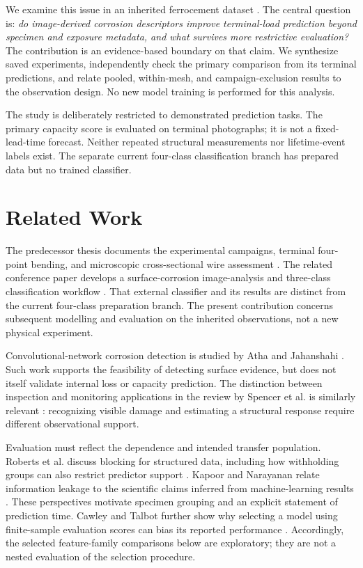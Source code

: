 \documentclass[conference]{IEEEtran}
\begin{document}
We examine this issue in an inherited ferrocement dataset \cite{hossain_thesis,artiste2025}. The central question is: \emph{do image-derived corrosion descriptors improve terminal-load prediction beyond specimen and exposure metadata, and what survives more restrictive evaluation?} The contribution is an evidence-based boundary on that claim. We synthesize saved experiments, independently check the primary comparison from its terminal predictions, and relate pooled, within-mesh, and campaign-exclusion results to the observation design. No new model training is performed for this analysis.

The study is deliberately restricted to demonstrated prediction tasks. The primary capacity score is evaluated on terminal photographs; it is not a fixed-lead-time forecast. Neither repeated structural measurements nor lifetime-event labels exist. The separate current four-class classification branch has prepared data but no trained classifier.

\section{Related Work}
The predecessor thesis documents the experimental campaigns, terminal four-point bending, and microscopic cross-sectional wire assessment \cite{hossain_thesis}. The related conference paper develops a surface-corrosion image-analysis and three-class classification workflow \cite{artiste2025}. That external classifier and its results are distinct from the current four-class preparation branch. The present contribution concerns subsequent modelling and evaluation on the inherited observations, not a new physical experiment.

Convolutional-network corrosion detection is studied by Atha and Jahanshahi \cite{atha2018}. Such work supports the feasibility of detecting surface evidence, but does not itself validate internal loss or capacity prediction. The distinction between inspection and monitoring applications in the review by Spencer et al. is similarly relevant \cite{spencer2019}: recognizing visible damage and estimating a structural response require different observational support.

Evaluation must reflect the dependence and intended transfer population. Roberts et al. discuss blocking for structured data, including how withholding groups can also restrict predictor support \cite{roberts2017}. Kapoor and Narayanan relate information leakage to the scientific claims inferred from machine-learning results \cite{kapoor2023}. These perspectives motivate specimen grouping and an explicit statement of prediction time. Cawley and Talbot further show why selecting a model using finite-sample evaluation scores can bias its reported performance \cite{cawley2010}. Accordingly, the selected feature-family comparisons below are exploratory; they are not a nested evaluation of the selection procedure.
\end{document}
